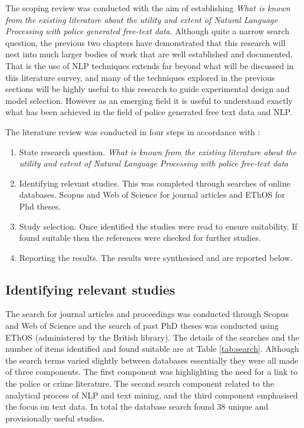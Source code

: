 The scoping review was conducted with the aim of establishing \emph{What is known from the existing literature about the utility and extent of Natural Language Processing with police generated free-text data}. Although quite a narrow search question, the previous two chapters have demonstrated that this research will nest into much larger bodies of work that are well established and documented. That is the use of NLP techniques extends far beyond what will be discussed in this literature survey, and many of the techniques explored in the previous sections will be highly useful to this research to guide experimental design and model selection. However as an emerging field it is useful to understand exactly what has been achieved in the field of police generated free text data and NLP. 


The literature review was conducted in four steps in accordance with \textcite{arksey2005scoping}:

\begin{enumerate}

\item State research question. \emph{What is known from the existing literature about the utility and extent of Natural Language Processing with police free-text data}
\item Identifying relevant studies. This was completed through searches of online databases. Scopus and Web of Science for journal articles and EThOS for Phd theses.

\item Study selection. Once identified the studies were read to ensure suitability. If found suitable then the references were checked for further studies.

\item Reporting the results. The results were synthesised and are reported below.


\end{enumerate}


\subsection{Identifying relevant studies}

The search for journal articles and proceedings was conducted through Scopus and Web of Science and the search of past PhD theses was conducted using EThOS (administered by the British library). The details of the searches and the number of items identified and found suitable are at Table \ref{tab:search}. Although the search terms varied slightly between databases essentially they were all made of three components. The first component was highlighting the need for a link to the police or crime literature. The second search component related to the analytical process of NLP and text mining, and the third component emphasised the focus on text data. In total the database search found 38 unique and provisionally useful studies.

